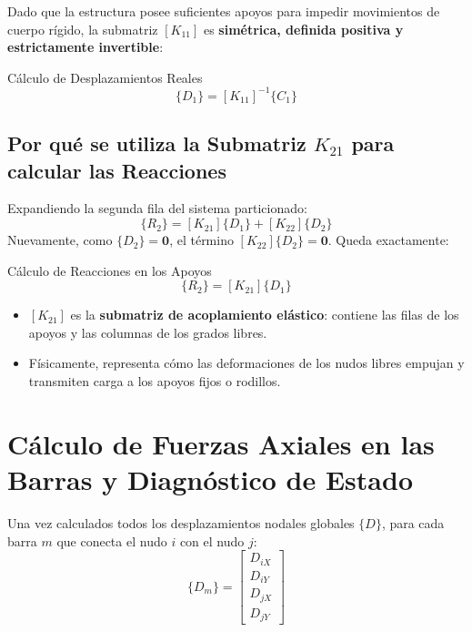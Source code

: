 \documentclass[11pt,a4paper]{article}
\begin{document}
Dado que la estructura posee suficientes apoyos para impedir movimientos de cuerpo rígido, la submatriz $[K_{11}]$ es \textbf{simétrica, definida positiva y estrictamente invertible}:
\begin{formulabox}{Cálculo de Desplazamientos Reales}
\begin{equation}
    \{D_1\} = [K_{11}]^{-1} \{C_1\}
\end{equation}
\end{formulabox}

\subsection{Por qué se utiliza la Submatriz $K_{21}$ para calcular las Reacciones}
Expandiendo la segunda fila del sistema particionado:
\begin{equation}
    \{R_2\} = [K_{21}] \{D_1\} + [K_{22}] \{D_2\}
\end{equation}
Nuevamente, como $\{D_2\} = \mathbf{0}$, el término $[K_{22}] \{D_2\} = \mathbf{0}$. Queda exactamente:
\begin{formulabox}{Cálculo de Reacciones en los Apoyos}
\begin{equation}
    \{R_2\} = [K_{21}] \{D_1\}
\end{equation}
\end{formulabox}
\begin{itemize}
    \item $[K_{21}]$ es la \textbf{submatriz de acoplamiento elástico}: contiene las filas de los apoyos y las columnas de los grados libres.
    \item Físicamente, representa cómo las deformaciones de los nudos libres empujan y transmiten carga a los apoyos fijos o rodillos.
\end{itemize}

\section{Cálculo de Fuerzas Axiales en las Barras y Diagnóstico de Estado}

Una vez calculados todos los desplazamientos nodales globales $\{D\}$, para cada barra $m$ que conecta el nudo $i$ con el nudo $j$:
\begin{equation}
    \{D_m\} = \begin{bmatrix} D_{iX} \\ D_{iY} \\ D_{jX} \\ D_{jY} \end{bmatrix}
\end{equation}
\end{document}

